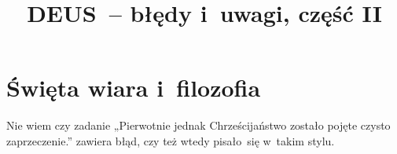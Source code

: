 \documentclass[a4paper,11pt]{article}
\title{DEUS~-- błędy i~uwagi, część II}
\begin{document}





\maketitle  %





\section{Święta wiara i~filozofia}

\vspace{\spaceTwo}










\start {} Nie wiem czy zadanie „Pierwotnie jednak
Chrześcijaństwo zostało pojęte czysto zaprzeczenie.” zawiera błąd,
czy też wtedy pisało~się w~takim stylu.

\vspace{\spaceFour}


\end{document}
